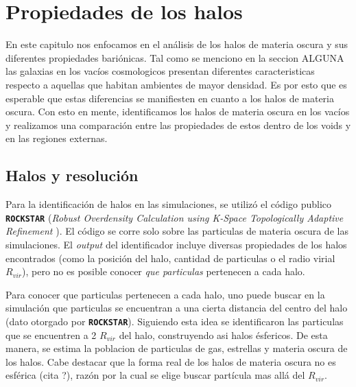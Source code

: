 \chapter{Propiedades de los halos}
\label{PropiedadesHalos}


En este capitulo nos enfocamos en el an\'alisis de los halos de materia oscura y sus diferentes propiedades bari\'onicas. Tal como se menciono en la seccion ALGUNA las galaxias en los vac\'ios cosmologicos presentan diferentes caracteristicas respecto a aquellas que habitan ambientes de mayor densidad. Es por esto que es esperable que estas diferencias se manifiesten en cuanto a los halos de materia oscura. Con esto en mente, identificamos los halos de materia oscura en los vac\'ios y realizamos una comparaci\'on entre las propiedades de estos dentro de los voids y en las regiones externas. 

\section{Halos y resoluci\'on}

Para la identificaci\'on de halos en las simulaciones, se utiliz\'o el c\'odigo publico \textbf{\texttt{ROCKSTAR}} \citep{Rockstar} (\textit{Robust Overdensity Calculation using K-Space Topologically Adaptive Refinement} ). El c\'odigo se corre solo sobre las particulas de materia oscura de las simulaciones. El \textit{output} del identificador incluye diversas propiedades de los halos encontrados (como la posici\'on del halo, cantidad de particulas o el radio virial $R_{vir}$), pero no es posible conocer \textit{que particulas} pertenecen a cada halo. 

Para conocer que particulas pertenecen a cada halo, uno puede buscar en la simulaci\'on que particulas se encuentran a una cierta distancia del centro del halo (dato otorgado por \textbf{\texttt{ROCKSTAR}}). Siguiendo esta idea se identificaron las particulas que se encuentren a 2 $R_{vir}$ del halo, construyendo asi halos \'esfericos. De esta manera, se estima la poblacion de particulas de gas, estrellas y materia oscura de los halos. Cabe destacar que la forma real de los halos de materia oscura no es esf\'erica (cita ?), raz\'on por la cual se elige buscar part\'icula mas all\'a del $R_{vir}$. 

